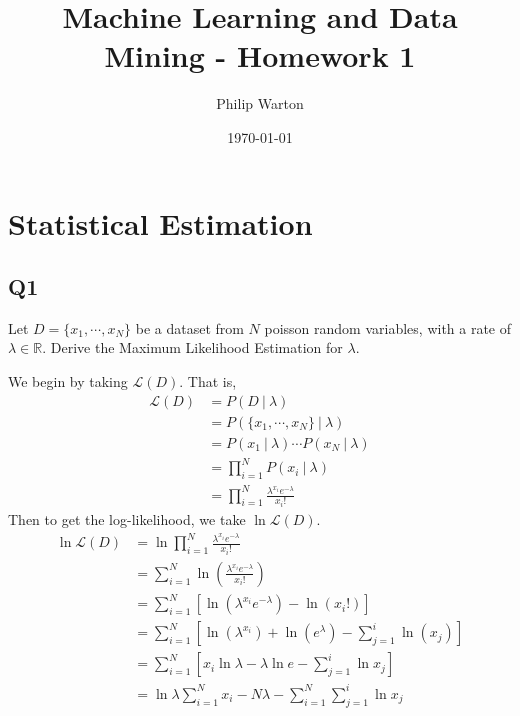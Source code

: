 \documentclass{article}
\theoremstyle{definition}
\begin{document}
\title{Machine Learning and Data Mining - Homework 1}
\author{Philip Warton}
\date{\today}
\maketitle
\section{Statistical Estimation}
    \subsection{Q1}
        \begin{mdframed}[]
            Let $D = \{x_1,\cdots,x_N\}$ be a dataset from $N$ poisson random variables, with a rate 
            of $\lambda \in \mathbb{R}$. Derive the Maximum Likelihood Estimation for $\lambda$.
        \end{mdframed}
        We begin by taking $\mathcal{L}(D)$. That is,
        \begin{align*}
            \mathcal{L}(D) &= P(D \ | \ \lambda) \\
            &=P(\{x_1,\cdots,x_N\} \ | \ \lambda) \\
            &=P(x_1 \ | \ \lambda ) \cdots P(x_N \ | \ \lambda) \\
            &= \prod_{i = 1}^NP(x_i \ | \ \lambda) \\
            &= \prod_{i = 1}^N \frac{\lambda^{x_i}e^{-\lambda}}{x_i!}
        \end{align*}
        Then to get the log-likelihood, we take $\ln \mathcal{L}(D)$.
        \begin{align*}
            \ln\mathcal{L}(D) &= \ln \prod_{i = 1}^N \frac{\lambda^{x_i}e^{-\lambda}}{x_i!}\\
            &= \sum_{i=1}^N \ln \left( \frac{\lambda^{x_i}e^{-\lambda}}{x_i!} \right) \\
            &= \sum_{i=1}^N \left[
                \ln(\lambda^{x_i}e^{-\lambda}) - \ln(x_i!)
            \right] \\
            &= \sum_{i=1}^N \left[
                \ln(\lambda^{x_i}) + \ln(e^{\lambda}) - \sum_{j=1}^i\ln(x_j)
            \right]\\
            &= \sum_{i = 1}^N \left[
                x_i \ln \lambda - \lambda \ln e - \sum_{j = 1}^i \ln x_j
            \right]\\
            &=\ln \lambda \sum_{i = 1}^Nx_i - N\lambda - \sum_{i = 1}^N \sum_{j = 1}^i \ln x_j
        \end{align*}
\end{document}
